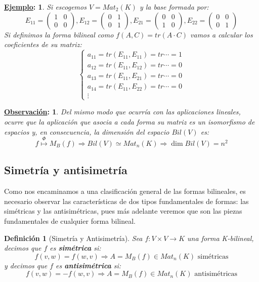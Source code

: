 \documentclass[10pt,a4paper,openright]{book}
\theoremstyle{break}
\newtheorem*{defi}{Definición}
\newtheorem*{obs}{\underline{Observación}:}
\newtheorem*{ej}{\underline{Ejemplo}:}
\begin{document}
\begin{ej}
Si escogemos $V=Mat_2(K)$ y la base formada por:
$$E_{11}=\begin{pmatrix} 1 & 0 \\ 0 & 0\end{pmatrix}, E_{12}=\begin{pmatrix} 0 & 1 \\ 0 & 1\end{pmatrix}, E_{21}=\begin{pmatrix} 0 & 0 \\ 1 & 0\end{pmatrix}, E_{22}=\begin{pmatrix} 0 & 0 \\ 0 & 1\end{pmatrix}$$
Si definimos la forma bilineal como $f(A,C)=tr(A\cdot C)$ vamos a  calcular los coeficientes de su matriz:
$$\begin{cases} a_{11} = tr(E_{11},E_{11})=tr\cdots = 1\\
a_{12} = tr(E_{11}, E_{12})= tr \cdots =0 \\ a_{13} = tr(E_{11},E_{21})=tr\cdots = 0 \\ a_{14} = tr(E_{11},E_{22})=tr\cdots = 0 \\ \vdots\end{cases}$$
\end{ej}

\begin{obs}
Del mismo modo que ocurría con las aplicaciones lineales, ocurre que la aplicación que asocia a cada forma su matriz es un isomorfismo de espacios y, en consecuencia, la dimensión del espacio $Bil(V)$ es:
$$f\stackrel{\Phi}{\longmapsto} M_B(f)\Rightarrow Bil(V)\simeq Mat_n(K)\Rightarrow \dim Bil(V)=n^2$$
\end{obs}

\subsection{Simetría y antisimetría}
Como nos encaminamos a una clasificación general de las formas bilineales, es necesario observar las características de dos tipos fundamentales de formas: las simétricas y las antisimétricas, pues más adelante veremos que son las piezas fundamentales de cualquier forma bilineal.

\begin{defi}[Simetría y Antisimetría]
Sea $f: V\times V \rightarrow K$ una forma K-bilineal, decimos que $f$ es \textbf{simétrica} si:
$$f(v,w)=f(w,v)\Rightarrow A=M_B(f)\in Mat_n(K) \mbox{ simétricas}$$
y decimos que $f$ es \textbf{antisimétrica} si:
$$f(v,w)=-f(w,v)\Rightarrow A=M_B(f)\in Mat_n(K) \mbox{ antisimétricas}$$
\end{defi}
\end{document}
